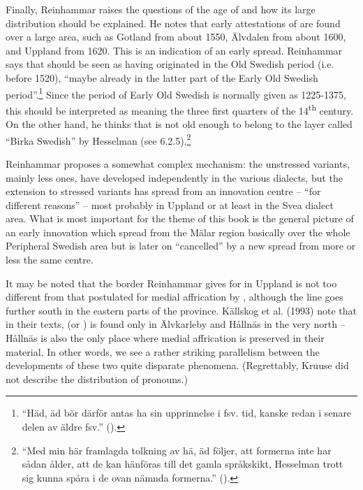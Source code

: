 
Finally, Reinhammar raises the questions of the age of  and how its large distribution should be explained. He notes that early attestations of  are found over a large area, such as Gotland from about 1550, Älvdalen from about 1600, and Uppland from 1620. This is an indication of an early spread. Reinhammar says that  should be seen as having originated in the Old Swedish period (i.e. before 1520), “maybe already in the latter part of the Early Old Swedish period”.\footnote{ “Häd, äd bör därför antas ha sin upprinnelse i fsv. tid, kanske redan i senare delen av äldre fsv.” (\citet[189]{Reinhammar1975}).} Since the period of Early Old Swedish is normally given as 1225-1375, this should be interpreted as meaning the three first quarters of the 14\textsuperscript{th} century. On the other hand, he thinks that is not old enough to belong to the layer called “Birka Swedish” by Hesselman (see 6.2.5).\footnote{ “Med min här framlagda tolkning av hä, äd följer, att formerna inte har sådan ålder, att de kan hänföras till det gamla språkskikt, Hesselman trott sig kunna spåra i de ovan nämnda formerna.” (\citet[190]{Reinhammar1975}).} 


 Reinhammar proposes a somewhat complex mechanism: the unstressed variants, mainly less ones, have developed independently in the various dialects, but the extension to stressed variants has spread from an innovation centre – “for different reasons” –  most probably in Uppland or at least in the Svea dialect area. What is most important for the theme of this book is the general picture of an early innovation which spread from the Mälar region basically over the whole Peripheral Swedish area but is later on “cancelled” by a new spread from more or less the same centre. 


It may be noted that the border Reinhammar gives for  in Uppland is not too different from that postulated for medial affrication by \citet{Kruuse1908}, although the  line goes further south in the eastern parts of the province. Källskog et al. (1993) note that in their texts,  (or ) is found only in Älvkarleby and Hållnäs in the very north – Hållnäs is also the only place where medial affrication is preserved in their material. In other words, we see a rather striking parallelism between the developments of these two quite disparate phenomena. (Regrettably, Kruuse did not describe the distribution of pronouns.)

